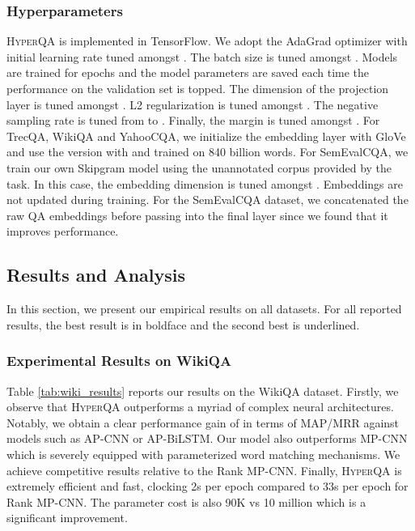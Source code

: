 \documentclass[sigconf]{acmart}
\begin{document}
\subsubsection{Hyperparameters}
\textsc{HyperQA} is implemented in TensorFlow. We adopt the AdaGrad \cite{DBLP:journals/jmlr/DuchiHS11} optimizer with initial learning rate tuned amongst . The batch size is tuned amongst . Models are trained for  epochs and the model parameters are saved each time the performance on the validation set is topped. The dimension of the projection layer is tuned amongst . L2 regularization is tuned amongst . The negative sampling rate is tuned from  to . Finally, the margin  is tuned amongst . For TrecQA, WikiQA and YahooCQA, we initialize the embedding layer with GloVe \cite{DBLP:conf/emnlp/PenningtonSM14} and use the version with  and trained on 840 billion words. For SemEvalCQA, we train our own Skipgram model using the unannotated corpus provided by the task.  In this case, the embedding dimension is tuned amongst . Embeddings are not updated during training. For the SemEvalCQA dataset, we concatenated the raw QA embeddings before passing into the final layer since we found that it improves performance.

\subsection{Results and Analysis}
In this section, we present our empirical results on all datasets. For all reported results, the best result is in boldface and the second best is underlined. 


\subsubsection{Experimental Results on WikiQA}
Table \ref{tab:wiki_results} reports our results on the WikiQA dataset. Firstly, we observe that \textsc{HyperQA} outperforms a myriad
of complex neural architectures. Notably, we obtain a clear performance gain of  in terms of MAP/MRR against models such as AP-CNN or
AP-BiLSTM. Our model also outperforms MP-CNN which is severely equipped with parameterized word matching mechanisms.  We achieve competitive results
relative to the Rank MP-CNN. Finally, \textsc{HyperQA} is extremely efficient and fast, clocking 2s per epoch compared to 33s per epoch for Rank MP-CNN. The parameter cost
is also 90K vs 10 million which is a significant improvement. 
\end{document}
